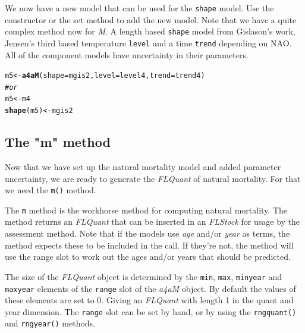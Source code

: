 \documentclass[a4paper,english,10pt]{article}\usepackage[]{graphicx}\usepackage[]{color}
\makeatletter
\newcommand{\hlcom}[1]{\textcolor[rgb]{0.678,0.584,0.686}{\textit{#1}}}%
\newcommand{\hlstd}[1]{\textcolor[rgb]{0.345,0.345,0.345}{#1}}%
\newcommand{\hlkwb}[1]{\textcolor[rgb]{0.69,0.353,0.396}{#1}}%
\newcommand{\hlkwc}[1]{\textcolor[rgb]{0.333,0.667,0.333}{#1}}%
\newcommand{\hlkwd}[1]{\textcolor[rgb]{0.737,0.353,0.396}{\textbf{#1}}}%
\newenvironment{kframe}{%
 \def\at@end@of@kframe{}%
 \ifinner\ifhmode%
  \def\at@end@of@kframe{\end{minipage}}%
  \begin{minipage}{\columnwidth}%
 \fi\fi%
 \def\FrameCommand##1{\hskip\@totalleftmargin \hskip-\fboxsep
 \colorbox{shadecolor}{##1}\hskip-\fboxsep
     \hskip-\linewidth \hskip-\@totalleftmargin \hskip\columnwidth}%
 \MakeFramed {\advance\hsize-\width
   \@totalleftmargin\z@ \linewidth\hsize
   \@setminipage}}%
 {\par\unskip\endMakeFramed%
 \at@end@of@kframe}
\newenvironment{knitrout}{}{} %
\newcommand{\code}[1]{{\texttt{#1}}}
\newcommand{\class}[1]{{\textit{#1}}}
\makeatother
\begin{document}
We now have a new model that can be used for the \code{shape} model. Use the constructor or the set method to add the new model. Note that we have a quite complex method now for \emph{M}. A length based \code{shape} model from Gislason's work, Jensen's third based temperature \code{level} and a time \code{trend} depending on NAO. All of the component models have uncertainty in their parameters.

\begin{knitrout}
\color{fgcolor}\begin{kframe}
\begin{alltt}
\hlstd{m5} \hlkwb{<-} \hlkwd{a4aM}\hlstd{(}\hlkwc{shape} \hlstd{= mgis2,} \hlkwc{level} \hlstd{= level4,} \hlkwc{trend} \hlstd{= trend4)}
\hlcom{# or}
\hlstd{m5} \hlkwb{<-} \hlstd{m4}
\hlkwd{shape}\hlstd{(m5)} \hlkwb{<-} \hlstd{mgis2}
\end{alltt}
\end{kframe}
\end{knitrout}


\subsection{The "m" method}

Now that we have set up the natural mortality model and added parameter uncertainty, we are ready to generate the \class{FLQuant} of natural mortality. For that we need the \code{m()} method.

The \code{m} method is the workhorse method for computing natural mortality. The method returns an \class{FLQuant} that can be inserted in an \class{FLStock} for usage by the assessment method. Note that if the models use \emph{age} and/or \emph{year} as terms, the method expects these to be included in the call. If they're not, the method will use the range slot to work out the ages and/or years that should be predicted.


The size of the \class{FLQuant} object is determined by the \code{min}, \code{max}, \code{minyear} and \code{maxyear} elements of the \code{range} slot of the \class{a4aM} object. By default the values of these elements are set to 0. Giving an \class{FLQuant} with length 1 in the quant and year dimension. The \code{range} slot can be set by hand, or by using the \code{rngquant()} and \code{rngyear()} methods.
\end{document}
